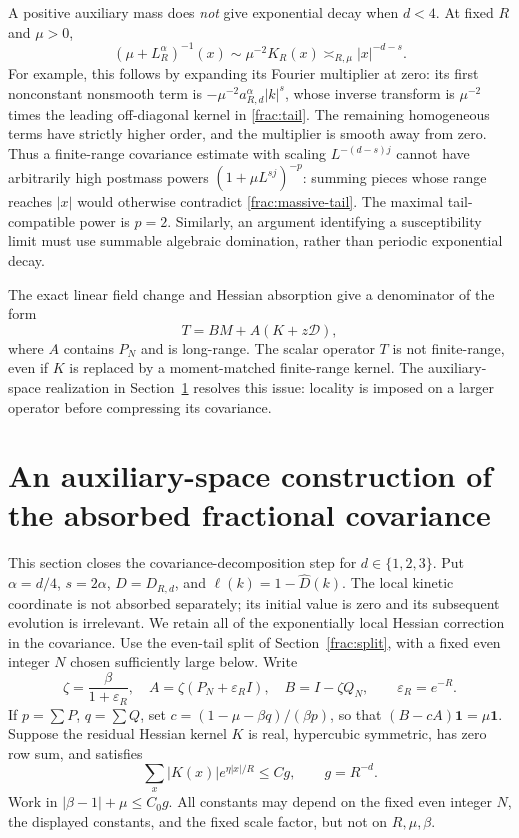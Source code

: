 \documentclass[11pt]{article}
\begin{document}
A positive auxiliary mass does \emph{not} give exponential decay
when \(d<4\). At fixed \(R\) and \(\mu>0\),
\begin{equation}\label{frac:massive-tail}
 (\mu+L_R^\alpha)^{-1}(x)
       \sim \mu^{-2}K_R(x)
       \asymp_{R,\mu}|x|^{-d-s}.
\end{equation}
For example, this follows by expanding its Fourier multiplier at
zero: its first nonconstant nonsmooth term is
\(-\mu^{-2}a_{R,d}^\alpha|k|^s\), whose inverse transform is
\(\mu^{-2}\) times the leading off-diagonal kernel in
\eqref{frac:tail}. The remaining homogeneous terms have strictly
higher order, and the multiplier is smooth away from zero.
Thus a finite-range covariance estimate with scaling
\(L^{-(d-s)j}\) cannot have arbitrarily high postmass powers
\((1+\mu L^{sj})^{-p}\): summing pieces whose range reaches
\(|x|\) would otherwise contradict \eqref{frac:massive-tail}.
The maximal tail-compatible power is \(p=2\). Similarly, an
argument identifying a susceptibility limit must use summable
algebraic domination, rather than periodic exponential decay.

The exact linear field change and Hessian absorption give a denominator
of the form
\[
 T=B M+A(K+z\mathcal D),
\]
where \(A\) contains \(P_N\) and is long-range. The scalar
operator \(T\) is not finite-range, even if \(K\) is replaced by a
moment-matched finite-range kernel. The auxiliary-space realization in
Section~\ref{complete:covariance} resolves this issue: locality is
imposed on a larger operator before compressing its covariance.

\section{An auxiliary-space construction of the absorbed fractional covariance}
\label{complete:covariance}
This section closes the covariance-decomposition step for
\(d\in\{1,2,3\}\). Put \(\alpha=d/4\), \(s=2\alpha\),
\(D=D_{R,d}\), and \(\ell(k)=1-\widehat D(k)\).
The local kinetic coordinate is not absorbed separately; its initial
value is zero and its subsequent evolution is irrelevant. We retain
all of the exponentially local Hessian correction in the covariance.
Use the even-tail split of Section~\ref{frac:split}, with a fixed
even integer \(N\) chosen sufficiently large below. Write
\[
 \zeta=\frac\beta{1+\varepsilon_R},\quad
 A=\zeta(P_N+\varepsilon_R I),\quad B=I-\zeta Q_N,
 \qquad \varepsilon_R=e^{-R}.
\]
If \(p=\sum P\), \(q=\sum Q\), set
\(c=(1-\mu-\beta q)/(\beta p)\), so that \((B-cA)\boldsymbol1
=\mu\boldsymbol1\). Suppose the residual Hessian kernel \(K\)
is real, hypercubic symmetric, has zero row sum, and satisfies
\begin{equation}\label{complete:K-assumption}
 \sum_x |K(x)|e^{\eta|x|/R}\le Cg,\qquad g=R^{-d}.
\end{equation}
Work in \(|\beta-1|+\mu\le C_0g\). All constants may depend
on the fixed even integer \(N\), the displayed constants, and the
fixed scale factor, but not on \(R,\mu,\beta\).
\end{document}
